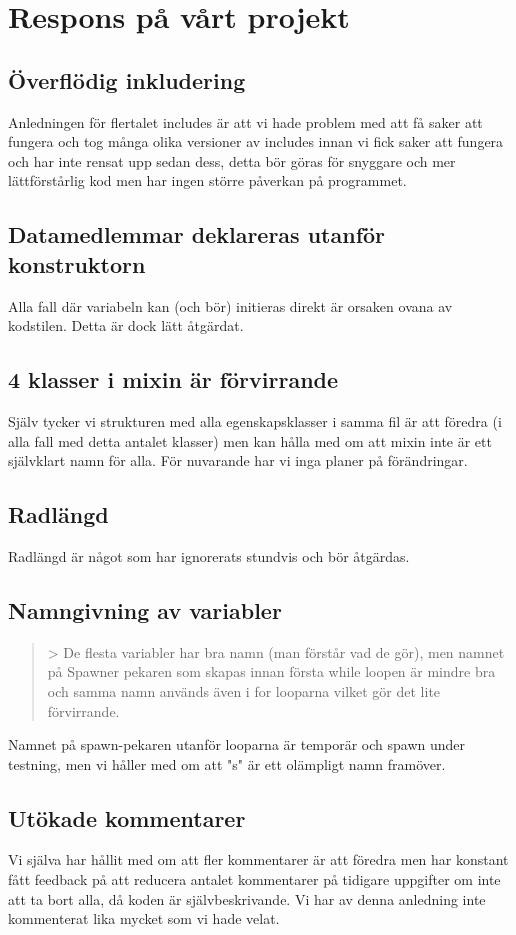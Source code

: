 \documentclass{TDP005mall}
\begin{document}
\section{Respons på vårt projekt}
\subsection{Överflödig inkludering}
Anledningen för flertalet includes är att vi hade problem med att få saker att fungera och tog många olika versioner av includes innan vi fick saker att fungera och har inte rensat upp sedan dess, detta bör göras för snyggare och mer lättförstårlig kod men har ingen större påverkan på programmet.

\subsection{Datamedlemmar deklareras utanför konstruktorn}
Alla fall där variabeln kan (och bör) initieras direkt är orsaken ovana av kodstilen. Detta är dock lätt åtgärdat.

\subsection{4 klasser i mixin är förvirrande}
Själv tycker vi strukturen med alla egenskapsklasser i samma fil är att föredra (i alla fall med detta antalet klasser) men kan hålla med om att mixin inte är ett självklart namn för alla. För nuvarande har vi inga planer på förändringar.

\subsection{Radlängd}
Radlängd är något som har ignorerats stundvis och bör åtgärdas.

\subsection{Namngivning av variabler}
\begin{quotation}
> De flesta variabler har bra namn (man förstår vad de gör), men namnet på Spawner pekaren som skapas innan första while loopen  är mindre bra och samma namn används även i for looparna vilket gör det lite förvirrande.
\end{quotation}
Namnet på spawn-pekaren utanför looparna är temporär och spawn under testning, men vi håller med om att "s" är ett olämpligt namn framöver.

\subsection{Utökade kommentarer}
Vi själva har hållit med om att fler kommentarer är att föredra men har konstant fått feedback på att reducera antalet kommentarer på tidigare uppgifter om inte att ta bort alla, då koden är självbeskrivande. Vi har av denna anledning inte kommenterat lika mycket som vi hade velat.
\end{document}
